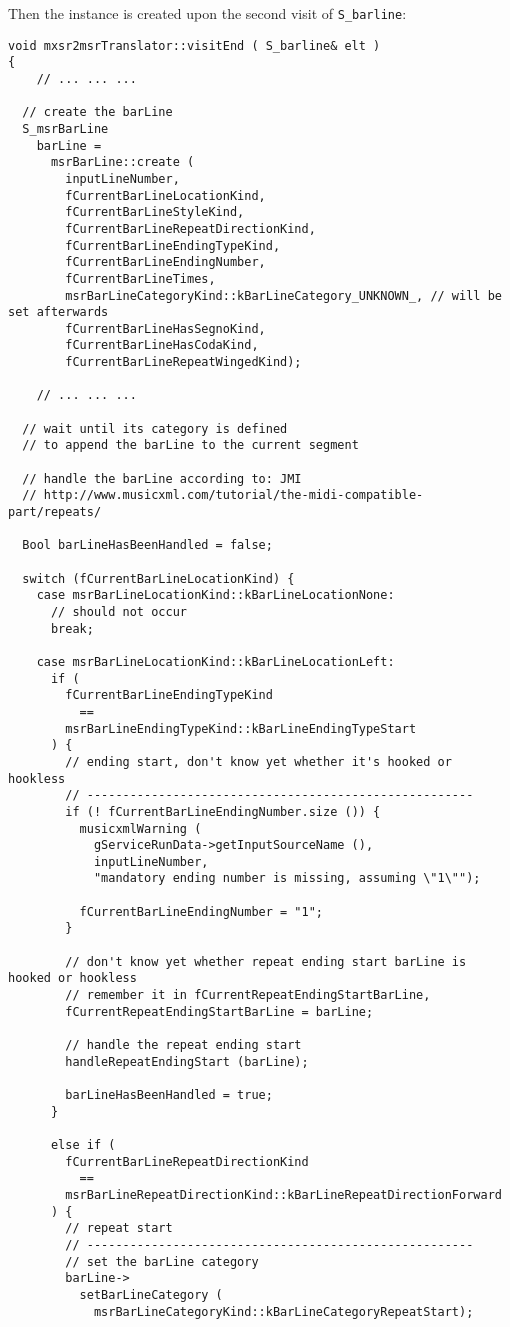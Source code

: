 Then the  instance is created upon the second visit of {\tt S_barline}:%
\begin{lstlisting}[language=CPlusPlus]
void mxsr2msrTranslator::visitEnd ( S_barline& elt )
{
	// ... ... ...

  // create the barLine
  S_msrBarLine
    barLine =
      msrBarLine::create (
        inputLineNumber,
        fCurrentBarLineLocationKind,
        fCurrentBarLineStyleKind,
        fCurrentBarLineRepeatDirectionKind,
        fCurrentBarLineEndingTypeKind,
        fCurrentBarLineEndingNumber,
        fCurrentBarLineTimes,
        msrBarLineCategoryKind::kBarLineCategory_UNKNOWN_, // will be set afterwards
        fCurrentBarLineHasSegnoKind,
        fCurrentBarLineHasCodaKind,
        fCurrentBarLineRepeatWingedKind);

	// ... ... ...

  // wait until its category is defined
  // to append the barLine to the current segment

  // handle the barLine according to: JMI
  // http://www.musicxml.com/tutorial/the-midi-compatible-part/repeats/

  Bool barLineHasBeenHandled = false;

  switch (fCurrentBarLineLocationKind) {
    case msrBarLineLocationKind::kBarLineLocationNone:
      // should not occur
      break;

    case msrBarLineLocationKind::kBarLineLocationLeft:
      if (
        fCurrentBarLineEndingTypeKind
          ==
        msrBarLineEndingTypeKind::kBarLineEndingTypeStart
      ) {
        // ending start, don't know yet whether it's hooked or hookless
        // ------------------------------------------------------
        if (! fCurrentBarLineEndingNumber.size ()) {
          musicxmlWarning (
            gServiceRunData->getInputSourceName (),
            inputLineNumber,
            "mandatory ending number is missing, assuming \"1\"");

          fCurrentBarLineEndingNumber = "1";
        }

        // don't know yet whether repeat ending start barLine is hooked or hookless
        // remember it in fCurrentRepeatEndingStartBarLine,
        fCurrentRepeatEndingStartBarLine = barLine;

        // handle the repeat ending start
        handleRepeatEndingStart (barLine);

        barLineHasBeenHandled = true;
      }

      else if (
        fCurrentBarLineRepeatDirectionKind
          ==
        msrBarLineRepeatDirectionKind::kBarLineRepeatDirectionForward
      ) {
        // repeat start
        // ------------------------------------------------------
        // set the barLine category
        barLine->
          setBarLineCategory (
            msrBarLineCategoryKind::kBarLineCategoryRepeatStart);


\end{lstlisting}
